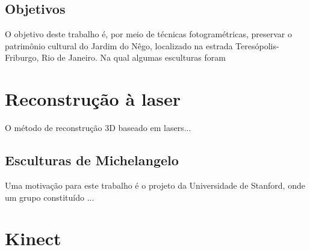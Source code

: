 \documentclass[table, usenames, svgnames, xcolor=dvipsnames]{beamer}
\begin{document}
\subsection{Objetivos}

\begin{frame} 
	\begin{center}
		O objetivo deste trabalho é, por meio de técnicas fotogramétricas, preservar o patrimônio cultural 
		do Jardim do Nêgo, localizado na estrada Teresópolis-Friburgo, Rio de Janeiro. Na qual algumas esculturas 
		foram 
	\end{center}
\end{frame}

\section{Reconstrução à laser}

\begin{frame} 
	\begin{center}
	O método de reconstrução 3D baseado em lasers...
	\end{center}
\end{frame}

\subsection{Esculturas de Michelangelo}

\begin{frame} 
	\begin{center}
		Uma motivação para este trabalho é o projeto da Universidade de Stanford, onde um grupo constituído ...
	\end{center}
\end{frame}

\section{Kinect}
\end{document}
